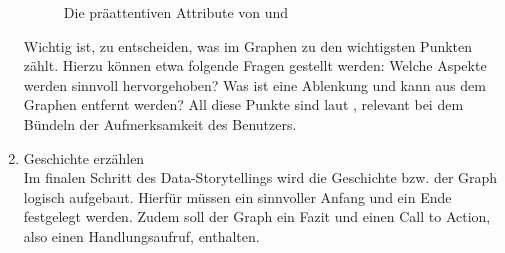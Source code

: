 \begin{enumerate}
\begin{figure}[h!]
    \caption{Die präattentiven Attribute von \cite{Knaflic.2016} und \cite{Few.2004}}
    \label{fig:attributes}
    \end{figure}
    Wichtig ist, zu entscheiden, was im Graphen zu den wichtigsten Punkten zählt. Hierzu können etwa folgende Fragen gestellt werden: Welche Aspekte werden sinnvoll hervorgehoben? Was ist eine Ablenkung und kann aus dem Graphen entfernt werden? All diese Punkte sind laut \cite{Knaflic.2016}, \cite{TalksatGoogle.2015} relevant bei dem Bündeln der Aufmerksamkeit des Benutzers.\\
    \item Geschichte erzählen\hfill\\ Im finalen Schritt des Data-Storytellings wird die Geschichte bzw. der Graph logisch aufgebaut. Hierfür müssen ein sinnvoller Anfang und ein Ende festgelegt werden. Zudem soll der Graph ein Fazit und einen Call to Action, also einen Handlungsaufruf, enthalten.
\end{enumerate}
